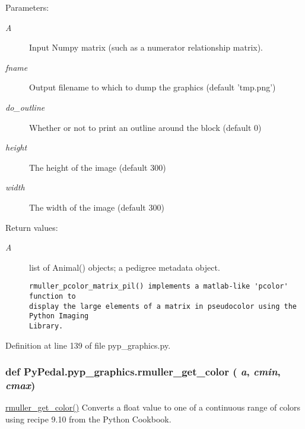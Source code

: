 \begin{Desc}
\item[Parameters:]
\begin{description}
\item[{\em A}]Input Numpy matrix (such as a numerator relationship matrix). \item[{\em fname}]Output filename to which to dump the graphics (default 'tmp.png') \item[{\em do\_\-outline}]Whether or not to print an outline around the block (default 0) \item[{\em height}]The height of the image (default 300) \item[{\em width}]The width of the image (default 300) \end{description}
\end{Desc}
\begin{Desc}
\item[Return values:]
\begin{description}
\item[{\em A}]list of Animal() objects; a pedigree metadata object.

\footnotesize\begin{verbatim}rmuller_pcolor_matrix_pil() implements a matlab-like 'pcolor' function to
display the large elements of a matrix in pseudocolor using the Python Imaging
Library.
\end{verbatim}
\normalsize
 \end{description}
\end{Desc}


Definition at line 139 of file pyp\_\-graphics.py.\hypertarget{namespacePyPedal_1_1pyp__graphics_3fb74d0dd1a9d4c263ac96c4deb92601}{
\subsubsection[rmuller\_\-get\_\-color]{\setlength{\rightskip}{0pt plus 5cm}def Py\-Pedal.pyp\_\-graphics.rmuller\_\-get\_\-color ( {\em a},  {\em cmin},  {\em cmax})}}
\label{namespacePyPedal_1_1pyp__graphics_3fb74d0dd1a9d4c263ac96c4deb92601}


\hyperlink{namespacePyPedal_1_1pyp__graphics_3fb74d0dd1a9d4c263ac96c4deb92601}{rmuller\_\-get\_\-color()} Converts a float value to one of a continuous range of colors using recipe 9.10 from the Python Cookbook. 

